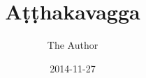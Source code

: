 \documentclass[
  final,
  pagePreset=tallpage,
  babelLanguage=slovene,
]{anecdote}
\title{Aṭṭhakavagga}
\subtitle{}
\author{The Author}
\date{2014-11-27}
\begin{document}
\frontmatter

\cleartorecto
\tableofcontents*

%



\mainmatter






\appendix



\backmatter

%


\end{document}
